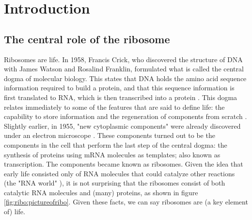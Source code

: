 
\section{Introduction}

\subsection{The central role of the ribosome}

Ribosomes are life.
%
In 1958, Francis Crick, who discovered the structure of DNA with James Watson and Rosalind Franklin,
formulated what is called the central dogma of molecular biology.
This states 
that DNA holds the amino acid sequence information required to build a protein, and that this sequence information is first translated to RNA, which is then transcribed into a protein \cite{Crick1958}.
% 
This dogma relates immediately to some of the features that are said to define life: 
the capability to store information and 
the regeneration of components from scratch \cite{Lawrence2005, Koshland2002}.
%
Slightly earlier, in 1955, "new cytoplasmic components" were already discovered under an electron microscope \cite{Palade1955}.
These components turned out to be the components in the cell that perform the last step of the central dogma: 
the synthesis of proteins using mRNA molecules as templates; also known as transcription.
The components became known as ribosomes.
%
Given the idea that early life consisted only of RNA molecules that could catalyze other reactions (the "RNA world" \cite{Campbell2002}), it is not surprising that the ribosomes 
consist of both catalytic RNA molecules and (many) proteins,
as shown in figure \ref{fig:ribo:pictureofribo}.
%
Given these facts, we can say ribosomes are (a key element of) life.


